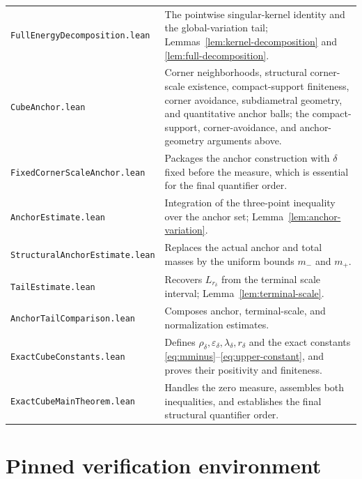 \documentclass[11pt]{article}
\theoremstyle{remark}
\begin{document}
\begin{center}
\begin{tabular}{@{}
  >{\raggedright\arraybackslash}p{}
  >{\raggedright\arraybackslash}p{}@{}}
\texttt{FullEnergyDecomposition.lean}
&
The pointwise singular-kernel identity and the global-variation tail;
Lemmas~\ref{lem:kernel-decomposition} and
\ref{lem:full-decomposition}.\\

\texttt{CubeAnchor.lean}
&
Corner neighborhoods, structural corner-scale existence, compact-support
finiteness, corner avoidance, subdiametral geometry, and quantitative
anchor balls; the compact-support, corner-avoidance, and anchor-geometry
arguments above.\\

\texttt{FixedCornerScaleAnchor.lean}
&
Packages the anchor construction with \(\delta\) fixed before the measure,
which is essential for the final quantifier order.\\

\texttt{AnchorEstimate.lean}
&
Integration of the three-point inequality over the anchor set;
Lemma~\ref{lem:anchor-variation}.\\

\texttt{StructuralAnchorEstimate.lean}
&
Replaces the actual anchor and total masses by the uniform bounds
\(m_-\) and \(m_+\).\\

\texttt{TailEstimate.lean}
&
Recovers \(L_{r_\delta}\) from the terminal scale interval;
Lemma~\ref{lem:terminal-scale}.\\

\texttt{AnchorTailComparison.lean}
&
Composes anchor, terminal-scale, and normalization estimates.\\

\texttt{ExactCubeConstants.lean}
&
Defines \(\rho_\delta,\varepsilon_\delta,\lambda_\delta,r_\delta\) and the
exact constants \eqref{eq:mminus}--\eqref{eq:upper-constant}, and proves
their positivity and finiteness.\\

\texttt{ExactCubeMainTheorem.lean}
&
Handles the zero measure, assembles both inequalities, and establishes the
final structural quantifier order.\\
\bottomrule
\end{tabular}
\end{center}

\section{Pinned verification environment}
\end{document}
